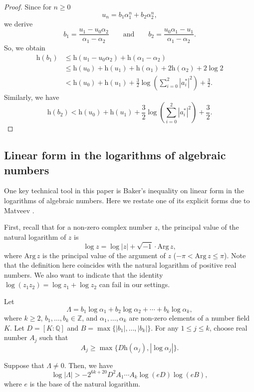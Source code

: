 \documentclass[12pt]{amsart}
\theoremstyle{definition}
\theoremstyle{remark}
\numberwithin{equation}{section}
\begin{document}
\begin{proof}

Since for $n\ge 0$
$$
u_n=b_1{\alpha}_1^n + b_2 {\alpha}_2^n,
$$
 we derive 
$$
b_1 =\frac{u_1-u_0{\alpha}_2}{{\alpha}_1 - {\alpha}_2} {\qquad\mbox{and}\qquad} b_2 =\frac{u_0{\alpha}_1-u_1}{{\alpha}_1 - {\alpha}_2}.
$$
So, we obtain
\begin{align*}
{\mathrm{h}}(b_1) & \le {\mathrm{h}}(u_1-u_0{\alpha}_2)+{\mathrm{h}}({\alpha}_1 - {\alpha}_2) \\
& \le {\mathrm{h}}(u_0)+{\mathrm{h}}(u_1)+{\mathrm{h}}({\alpha}_1)+2{\mathrm{h}}({\alpha}_2)+2\log 2 \\
& < {\mathrm{h}}(u_0)+{\mathrm{h}}(u_1)+\frac{3}{2} \log (\sum_{i=0}^{2}|a_i^*|^2) + \frac{3}{2}.
\end{align*}
Similarly, we have
$$
{\mathrm{h}}(b_2) < {\mathrm{h}}(u_0)+{\mathrm{h}}(u_1)+\frac{3}{2} \log (\sum_{i=0}^{2}|a_i^*|^2) + \frac{3}{2}.
$$
\end{proof}

\subsection{Linear form in the logarithms of algebraic numbers}

One key technical tool in this paper is Baker's inequality on linear form in the logarithms of algebraic numbers. Here we restate one of its explicit forms due to Matveev \cite[Corollary 2.3]{Matveev}.

First, recall that for a non-zero complex number $z$, the principal value of the natural logarithm of $z$ is
$$
\log z = \log |z| + \sqrt{-1} \cdot {\mathrm{Arg}} \, z,
$$
where ${\mathrm{Arg}} \, z$ is the principal value of the argument of $z$ ($-\pi < {\mathrm{Arg}} \, z \le \pi$). Note that the definition here coincides with the natural logarithm of positive real numbers.   We also want to indicate that the identity $\log (z_1z_2)=\log z_1 + \log z_2$ can fail in our settings. 

Let
$$
\Lambda = b_1 \log {\alpha}_1 + b_2 \log {\alpha}_2 + \cdots + b_k \log {\alpha}_k,
$$
where $k\ge 2$, $b_1,\ldots,b_k \in {{\mathbb Z}}$, and ${\alpha}_1,\ldots, {\alpha}_k$ are non-zero elements of a number field $K$. Let $D=[K:{{\mathbb Q}}]$ and $B=\max \{ |b_1|,\ldots, |b_k| \}$. For any $1 \le j \le k$,  choose real number $A_j$ such that
$$
A_j \ge \max \{ D{\mathrm{h}}({\alpha}_j), |\log {\alpha}_j | \}.
$$

Suppose that $\Lambda \ne 0$. Then, we have
\begin{equation}
\label{Baker}
\log |\Lambda| > -2^{6k+20}D^2A_1\cdots A_k \log (eD) \log (eB),
\end{equation}
where $e$ is the base of the natural logarithm.
\end{document}

